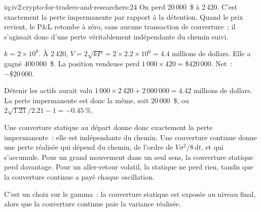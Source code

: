 \begin{solution}{iq:iv2:crypto-for-traders-and-researchers:24}
On perd 20\,000~\$ à 2\,420. C'est exactement la perte impermanente par rapport à la détention. Quand le prix revient, le P\&L retombe à zéro, sans aucune transaction de couverture~; il s'agissait donc d'une perte véritablement indépendante du chemin suivi.

$k = 2 \times 10^9$. À 2\,420, $V = 2\sqrt{kP} = 2 \times 2.2 \times 10^6 = 4.4$ millions de dollars. Elle a gagné 400\,000~\$. La position vendeuse perd $1\,000 \times 420 = \$420\,000$. Net~: $-\$20\,000$.

Détenir les actifs aurait valu $1\,000 \times 2\,420 + 2\,000\,000 = 4.42$ millions de dollars. La perte impermanente est donc la même, soit 20\,000~\$, ou $2\sqrt{1.21}/2.21 - 1 = -0.45~\%$.

Une couverture statique au départ donne donc exactement la perte impermanente~: elle est indépendante du chemin. Une couverture continue donne une perte réalisée qui dépend du chemin, de l'ordre de $V\sigma^2/8\,\mathrm{d}t$, et qui s'accumule. Pour un grand mouvement dans un seul sens, la couverture statique perd davantage. Pour un aller-retour volatil, la statique ne perd rien, tandis que la couverture continue a payé chaque oscillation.

C'est un choix sur le gamma~: la couverture statique est exposée au niveau final, alors que la couverture continue paie la variance réalisée.

\end{solution}

